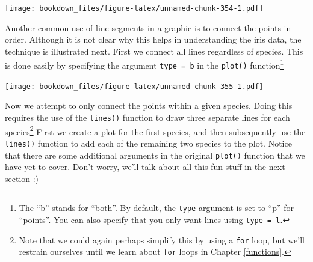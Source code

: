 \documentclass[
]{krantz}
\makeatletter
\newenvironment{Shaded}{\begin{snugshade}}{\end{snugshade}}
\newcommand{\DataTypeTok}[1]{\textcolor[rgb]{0.27,0.27,0.27}{#1}}
\newcommand{\DecValTok}[1]{\textcolor[rgb]{0.06,0.06,0.06}{#1}}
\newcommand{\FloatTok}[1]{\textcolor[rgb]{0.06,0.06,0.06}{#1}}
\newcommand{\KeywordTok}[1]{\textcolor[rgb]{0.27,0.27,0.27}{\textbf{#1}}}
\newcommand{\NormalTok}[1]{#1}
\newcommand{\OperatorTok}[1]{\textcolor[rgb]{0.43,0.43,0.43}{\textbf{#1}}}
\newcommand{\StringTok}[1]{\textcolor[rgb]{0.5,0.5,0.5}{#1}}
\newenvironment{kframe}{%
\medskip{}
\setlength{\fboxsep}{.8em}
 \def\at@end@of@kframe{}%
 \ifinner\ifhmode%
  \def\at@end@of@kframe{\end{minipage}}%
  \begin{minipage}{\columnwidth}%
 \fi\fi%
 \def\FrameCommand##1{\hskip\@totalleftmargin \hskip-\fboxsep
 \colorbox{shadecolor}{##1}\hskip-\fboxsep
     \hskip-\linewidth \hskip-\@totalleftmargin \hskip\columnwidth}%
 \MakeFramed {\advance\hsize-\width
   \@totalleftmargin\z@ \linewidth\hsize
   \@setminipage}}%
 {\par\unskip\endMakeFramed%
 \at@end@of@kframe}
\renewenvironment{Shaded}{\begin{kframe}}{\end{kframe}}
\makeatother
\begin{document}
\texttt{[image: bookdown\_files/figure-latex/unnamed-chunk-354-1.pdf]}

Another common use of line segments in a graphic is to connect the points in order. Although it is not clear why this helps in understanding the iris data, the technique is illustrated next. First we connect all lines regardless of species. This is done easily by specifying the argument \texttt{type\ =\ \textquotesingle{}b\textquotesingle{}} in the \texttt{plot()} function\footnote{The ``b'' stands for ``both''. By default, the \texttt{type} argument is set to ``p'' for ``points''. You can also specify that you only want lines using \texttt{type\ =\ \textquotesingle{}l\textquotesingle{}}.}

\begin{Shaded}
\end{Shaded}

\texttt{[image: bookdown\_files/figure-latex/unnamed-chunk-355-1.pdf]}

Now we attempt to only connect the points within a given species. Doing this requires the use of the \texttt{lines()} function to draw three separate lines for each species\footnote{Note that we could again perhaps simplify this by using a \texttt{for} loop, but we'll restrain ourselves until we learn about \texttt{for} loops in Chapter \ref{functions}.} First we create a plot for the first species, and then subsequently use the \texttt{lines()} function to add each of the remaining two species to the plot. Notice that there are some additional arguments in the original \texttt{plot()} function that we have yet to cover. Don't worry, we'll talk about all this fun stuff in the next section :)
\end{document}

